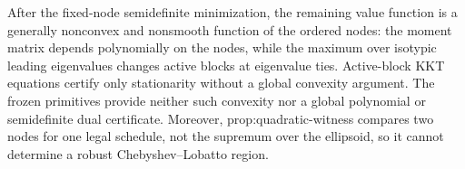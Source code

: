 After the fixed-node semidefinite minimization, the remaining value function is a generally nonconvex and nonsmooth function of the ordered nodes: the moment matrix depends polynomially on the nodes, while the maximum over isotypic leading eigenvalues changes active blocks at eigenvalue ties.  Active-block KKT equations certify only stationarity without a global convexity argument.  The frozen primitives provide neither such convexity nor a global polynomial or semidefinite dual certificate.  Moreover, prop:quadratic-witness compares two nodes for one legal schedule, not the supremum over the ellipsoid, so it cannot determine a robust Chebyshev--Lobatto region.